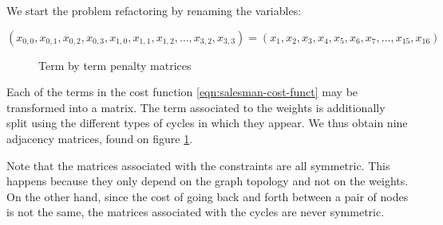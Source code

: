 \begin{table}[H]
	\centering
	\caption{Graphical representation of penalties between interactions \cite{Sarkar2020}}
	\label{fig:salesman-penalties}
\end{table}

We start the problem refactoring by renaming the variables:

$$ (x_{0,0}, x_{0,1}, x_{0,2}, x_{0,3}, x_{1,0}, x_{1,1}, x_{1,2}, \dots, x_{3,2}, x_{3,3}) =
(x_1, x_2, x_3, x_4, x_5, x_6, x_7, \dots, x_{15}, x_{16}) $$

\begin{figure}[H]
	\centering
	\caption{Term by term penalty matrices \cite{Sarkar2020}}
	\label{fig:salesman-adj-matrices}
\end{figure}

Each of the terms in the cost function \ref{eqn:salesman-cost-funct} may be transformed into a matrix. The term associated to the weights is additionally split using the different types of cycles in which they appear. We thus obtain nine adjacency matrices, found on figure \ref{fig:salesman-adj-matrices}.

Note that the matrices associated with the constraints are all symmetric. This happens because they only depend on the graph topology and not on the weights. On the other hand, since the cost of going back and forth between a pair of nodes is not the same, the matrices associated with the cycles are never symmetric.

